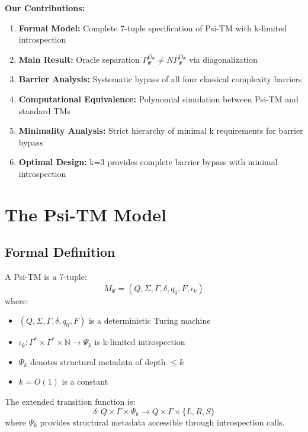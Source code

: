 \documentclass[11pt]{article}
\begin{document}
\textbf{Our Contributions:}
\begin{enumerate}
\item \textbf{Formal Model:} Complete 7-tuple specification of Psi-TM with k-limited introspection
\item \textbf{Main Result:} Oracle separation $P^{O_\Psi}_\Psi \neq NP^{O_\Psi}_\Psi$ via diagonalization
\item \textbf{Barrier Analysis:} Systematic bypass of all four classical complexity barriers
\item \textbf{Computational Equivalence:} Polynomial simulation between Psi-TM and standard TMs
\item \textbf{Minimality Analysis:} Strict hierarchy of minimal k requirements for barrier bypass
\item \textbf{Optimal Design:} k=3 provides complete barrier bypass with minimal introspection
\end{enumerate}

\section{The Psi-TM Model}

\subsection{Formal Definition}

\begin{definition}[Psi-TM]
A Psi-TM is a 7-tuple:
$$M_\Psi = (Q, \Sigma, \Gamma, \delta, q_0, F, \iota_k)$$
where:
\begin{itemize}
\item $(Q, \Sigma, \Gamma, \delta, q_0, F)$ is a deterministic Turing machine
\item $\iota_k: \Gamma^* \times \Gamma^* \times \mathbb{N} \to \Psi_k$ is k-limited introspection
\item $\Psi_k$ denotes structural metadata of depth $\leq k$
\item $k = O(1)$ is a constant
\end{itemize}
\end{definition}

\begin{definition}
The extended transition function is:
$$\delta: Q \times \Gamma \times \Psi_k \to Q \times \Gamma \times \{L, R, S\}$$
where $\Psi_k$ provides structural metadata accessible through introspection calls.
\end{definition}
\end{document}
